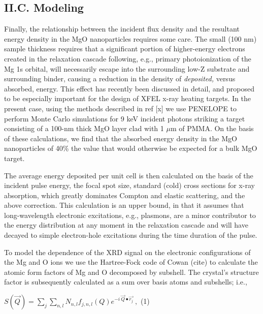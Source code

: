 \subsection{II.C. Modeling}

Finally, the relationship between the incident flux density and the
resultant energy density in the MgO nanoparticles requires some care.
The small (100 nm) sample thickness requires that a significant portion
of higher-energy electrons created in the relaxation cascade following,
e.g., primary photoionization of the Mg 1s orbital, will necessarily
escape into the surrounding low-Z substrate and surrounding binder,
causing a reduction in the density of \emph{deposited,} versus absorbed,
energy. This effect has recently been
discussed in detail, and proposed to be especially important for the
design of XFEL x-ray heating targets. In the present case, using the
methods described in ref {[}x{]} we use PENELOPE to perform Monte Carlo
simulations for 9 keV incident photons striking a target consisting of a
100-nm thick MgO layer clad with 1 $\mu$m of PMMA. On the
basis of these calculations, we find that the absorbed energy density in
the MgO nanoparticles of 40\% the value that would otherwise be expected
for a bulk MgO target.

The average energy deposited per unit cell is then calculated on the
basis of the incident pulse energy, the focal spot size, standard (cold)
cross sections for x-ray absorption, which greatly dominates Compton and
elastic scattering, and the above correction. This calculation is an
upper bound, in that it assumes that long-wavelength electronic
excitations, e.g., plasmons, are a minor contributor to the energy
distribution at any moment in the relaxation cascade and will have
decayed to simple electron-hole excitations during the time duration of
the pulse.

To model the dependence of the XRD signal on the electronic
configurations of the Mg and O ions we use the Hartree-Fock code of
Cowan (cite) to calculate the atomic form factors of Mg and O decomposed
by subshell. The crystal's structure factor is subsequently calculated
as a sum over basis atoms and subshells; i.e.,

\begin{centering}
\(S\left( \overrightarrow{Q} \right) = \sum_{j}^{}{\sum_{n,l}N_{n,l}f_{j,n,l}\left( Q \right)e^{- i\ \overrightarrow{Q} \bullet \overrightarrow{r_{j}}}\ },\)
(1)
\end{centering}

